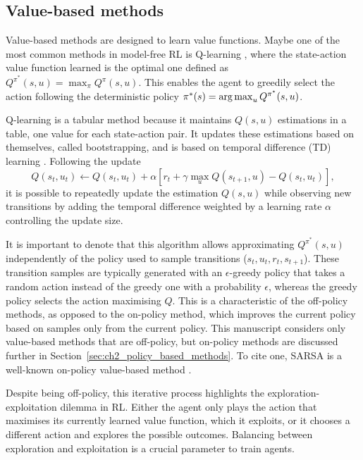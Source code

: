 \subsection{Value-based methods} \label{sec:ch2_value_based_methods}
Value-based methods are designed to learn value functions.
Maybe one of the most common methods in model-free RL is Q-learning \citep{watkins1992q}, where the state-action value function learned is the optimal one defined as $Q^{\pi^*}(s, u)=\max_{\pi}Q^\pi(s, u)$.
This enables the agent to greedily select the action following the deterministic policy $\pi^*(s)=\operatorname*{arg\,max}_u Q^{\pi^*}(s, u)$.

Q-learning is a tabular method because it maintains $Q(s, u)$ estimations in a table, one value for each state-action pair.
It updates these estimations based on themselves, called bootstrapping, and is based on temporal difference (TD) learning \citep{sutton2018reinforcement}.
Following the update 
\begin{equation}
\label{eq:ch2_QLearning}
    Q(s_t, u_t) \leftarrow Q(s_t, u_t) + \alpha \left[ r_t + \gamma \max_u Q(s_{t+1}, u) - Q(s_t, u_t) \right],
\end{equation}
it is possible to repeatedly update the estimation $Q(s, u)$ while observing new transitions by adding the temporal difference weighted by a learning rate $\alpha$ controlling the update size.

It is important to denote that this algorithm allows approximating $Q^{\pi^*}(s, u)$ independently of the policy used to sample transitions ($s_t, u_t, r_t, s_{t+1}$).
These transition samples are typically generated with an $\epsilon$-greedy policy that takes a random action instead of the greedy one with a probability $\epsilon$, whereas the greedy policy selects the action maximising $Q$.
This is a characteristic of the off-policy methods, as opposed to the on-policy method, which improves the current policy based on samples only from the current policy.
This manuscript considers only value-based methods that are off-policy, but on-policy methods are discussed further in Section~\ref{sec:ch2_policy_based_methods}.
To cite one, SARSA is a well-known on-policy value-based method \citep{sutton2018reinforcement}.

Despite being off-policy, this iterative process highlights the exploration-exploitation dilemma in RL.
Either the agent only plays the action that maximises its currently learned value function, which it exploits, or it chooses a different action and explores the possible outcomes.
Balancing between exploration and exploitation is a crucial parameter to train agents.

